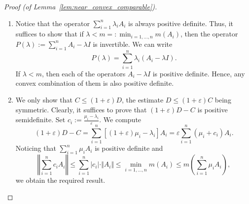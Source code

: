 \documentclass{amsart}
\newcommand{\e}{\varepsilon}
\theoremstyle{definition}
\theoremstyle{remark}
\begin{document}
\begin{proof}[Proof (of Lemma~\ref{lem:near_convex_comparable})]

    \begin{enumerate}
        \item Notice that the operator $\sum_{i=1}^{n}\lambda_iA_i$ is always positive definite. Thus, it suffices to show that if $\lambda<m=:\min_{i=1,\ldots,n}m(A_i)$, then the operator $P(\lambda):=\sum_{i=1}^{n}A_i-\lambda I$ is invertible. We can write
        \begin{equation*}
            P(\lambda)=\sum_{i=1}^{n}\lambda_i(A_i-\lambda I).
        \end{equation*}
        If $\lambda<m$, then each of the operators $A_i-\lambda I$ is positive definite. Hence, any convex combination of them is also positive definite.

        \item We only show that $C\leq(1+\e)D$, the estimate $D
        \leq(1+\e)C$ being symmetric. Clearly, it suffices to prove that $(1+\e)D-C$ is positive semidefinite. Set $c_i:=\frac{\mu_i-\lambda_i}{\e}$. We compute
        \begin{equation*}
            (1+\e)D-C=\sum_{i=1}^{n}[(1+\e)\mu_i-\lambda_i]A_i=\e\sum_{i=1}^{n}(\mu_{i}+c_i)A_i.
        \end{equation*}
        Noticing that $\sum_{i=1}^{n}\mu_{i}A_i$ is positive definite and
        \begin{equation*}
            \left\Vert\sum_{i=1}^{n}c_iA_i\right\Vert\leq\sum_{i=1}^{n}|c_i|\cdot\Vert A_i\Vert\leq \min_{i=1,\ldots,n}m(A_i)\leq m\left(\sum_{i=1}^{n}\mu_iA_i\right),
        \end{equation*}
        we obtain the required result.
    \end{enumerate}
\end{proof}
\end{document}
